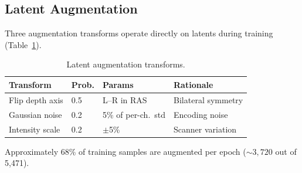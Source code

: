 \subsection{Latent Augmentation}

Three augmentation transforms operate directly on latents during training
(Table~\ref{tab:augmentation}).

\begin{table}[ht]
\centering
\caption{Latent augmentation transforms.}
\label{tab:augmentation}
\begin{tabular}{llll}
\toprule
\textbf{Transform} & \textbf{Prob.} & \textbf{Params} & \textbf{Rationale} \\
\midrule
Flip depth axis   & 0.5 & L--R in RAS        & Bilateral symmetry \\
Gaussian noise    & 0.2 & 5\% of per-ch.\ std & Encoding noise \\
Intensity scale   & 0.2 & $\pm$5\%            & Scanner variation \\
\bottomrule
\end{tabular}
\end{table}

Approximately 68\% of training samples are augmented per epoch
(${\sim}3{,}720$ out of 5,471).
